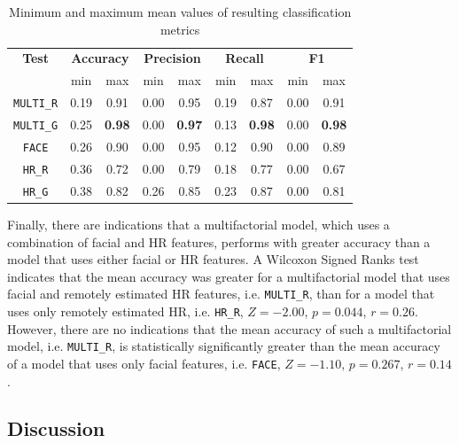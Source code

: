 \begin{table}[!htbp]
  \centering
  \caption{Minimum and maximum mean values of resulting classification metrics}
  \label{table:study5-result-metrics-minmax}
  \begin{tabular}{ccccccccc}
    \toprule%
      \textbf{Test} & \multicolumn{2}{c}{\textbf{Accuracy}} & \multicolumn{2}{c}{\textbf{Precision}} & \multicolumn{2}{c}{\textbf{Recall}} & \multicolumn{2}{c}{\textbf{F1}} \\
      {} & min & max & min & max & min & max & min & max \\
    \midrule%
      \texttt{MULTI\_R}  & 0.19 & 0.91 & 0.00 & 0.95 & 0.19 & 0.87 & 0.00 & 0.91 \\ %
      \texttt{MULTI\_G}  & 0.25 & \textbf{0.98} & 0.00 & \textbf{0.97} & 0.13 & \textbf{0.98} & 0.00 & \textbf{0.98} \\ %
      \texttt{FACE}  & 0.26 & 0.90 & 0.00 & 0.95 & 0.12 & 0.90 & 0.00 & 0.89 \\ %
      \texttt{HR\_R}  & 0.36 & 0.72 & 0.00 & 0.79 & 0.18 & 0.77 & 0.00 & 0.67 \\ %
      \texttt{HR\_G}  & 0.38 & 0.82 & 0.26 & 0.85 & 0.23 & 0.87 & 0.00 & 0.81 \\ %
    \bottomrule%
  \end{tabular}
\end{table}


Finally, there are indications that a multifactorial model, which uses a combination of facial and HR features, performs with greater accuracy than a model that uses either facial or HR features. A Wilcoxon Signed Ranks test indicates that the mean accuracy was greater for a multifactorial model that uses facial and remotely estimated HR features, i.e. \texttt{MULTI\_R}, than for a model that uses only remotely estimated HR, i.e. \texttt{HR\_R}, $Z=-2.00$, $p=0.044$, $r=0.26$. However, there are no indications that the mean accuracy of such a multifactorial model, i.e. \texttt{MULTI\_R}, is statistically significantly greater than the mean accuracy of a model that uses only facial features, i.e. \texttt{FACE}, $Z=-1.10$, $p=0.267$, $r=0.14$.

\subsection{Discussion}

